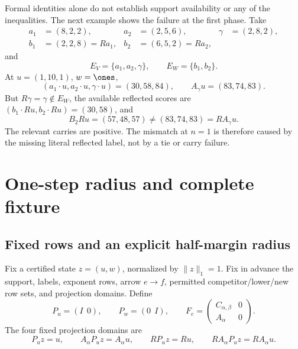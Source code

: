 \documentclass[11pt]{article}
\theoremstyle{definition}
\theoremstyle{remark}
\begin{document}
Formal identities alone do not establish support availability or any of
the inequalities.  The next example shows the failure at the first phase.
Take
\[
\begin{aligned}
a_1&=(8,2,2),&a_2&=(2,5,6),&\gamma&=(2,8,2),\\
b_1&=(2,2,8)=Ra_1,&b_2&=(6,5,2)=Ra_2,
\end{aligned}
\tag{6.5}
\]
and
\[
 E_V=\{a_1,a_2,\gamma\},\qquad E_W=\{b_1,b_2\}.
\tag{6.6}
\]
At \(u=(1,10,1)\), \(w=\ones\),
\[
 (a_1\cdot u,a_2\cdot u,\gamma\cdot u)=(30,58,84),
 \qquad A_\gamma u=(83,74,83).
\]
But \(R\gamma=\gamma\notin E_W\), the available reflected scores are
\((b_1\cdot Ru,b_2\cdot Ru)=(30,58)\), and
\[
 B_2Ru=(57,48,57)\neq(83,74,83)=RA_\gamma u.
\tag{6.7}
\]
The relevant carries are positive.  The mismatch at \(n=1\) is therefore
caused by the missing literal reflected label, not by a tie or carry
failure.

\section{One-step radius and complete fixture}

\subsection{Fixed rows and an explicit half-margin radius}

Fix a certified state \(z=(u,w)\), normalized by \(\|z\|_1=1\).  Fix in
advance the support, labels, exponent rows, arrow \(e\to f\), permitted
competitor/lower/new row sets, and projection domains.  Define
\[
 P_u=(I\ \ 0),\qquad P_w=(0\ \ I),\qquad
 F_e=\begin{pmatrix}C_{\alpha,\beta}&0\\A_\alpha&0\end{pmatrix}.
\tag{7.1}
\]
The four fixed projection domains are
\[
 P_uz=u,\qquad A_\alpha P_uz=A_\alpha u,\qquad
 RP_uz=Ru,\qquad RA_\alpha P_uz=RA_\alpha u.
\tag{7.2}
\]
\end{document}
